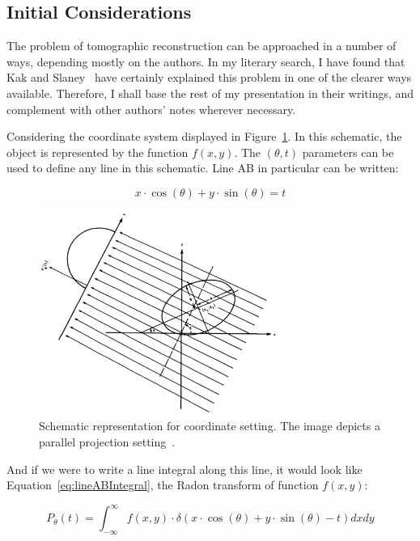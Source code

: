 \subsection{Initial Considerations}%
\label{sub:initial_considerations}

The problem of tomographic reconstruction can be approached in a number
of ways, depending mostly on the authors. In my literary search, I have
found that Kak and Slaney~\cite{Kak2001} have certainly explained this
problem in one of the clearer ways available. Therefore, I shall base
the rest of my presentation in their writings, and complement with other
authors' notes wherever necessary.

Considering the coordinate system displayed in
Figure~\ref{fig:coordinates}. In this schematic, the object is
represented by the function $f(x, y)$. The  $(\theta, t)$ parameters can
be used to define any line in this schematic. Line AB in particular can
be written:

\begin{equation}
    \label{eq:lineAB}
    x \cdot \cos(\theta) + y \cdot \sin(\theta) = t
\end{equation}

\begin{figure}[htpb]
    \centering
    \includegraphics[width=0.7\textwidth]{img/coordinates.png}
    \caption{Schematic representation for coordinate setting. The image
    depicts a parallel projection setting~\cite{Kak2001a}.}
    \label{fig:coordinates}
\end{figure}

And if we were to write a line integral along this line, it would look
like Equation~\ref{eq:lineABIntegral}, the Radon transform of function
$f(x, y)$:

\begin{equation}
    \label{eq:lineABIntegral}
    P_{\theta}(t) = \int_{-\infty}^{\infty} f(x, y) \cdot \delta(x \cdot
    \cos(\theta) + y \cdot \sin(\theta) - t) dxdy
\end{equation}

